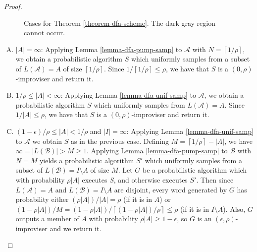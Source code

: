 \documentclass[a4paper,USenglish,numberwithinsect]{lipics}
\theoremstyle{plain}
\theoremstyle{definition}
\newcommand{\ceil}[1]{\left\lceil #1\right\rceil}
\newcommand{\improvs}{I}
\newcommand{\valids}{A}
\begin{document}
\begin{proof}
{\begin{figure}
\caption{Cases for Theorem \ref{theorem-dfa-scheme}. The dark gray
region cannot occur.}
\label{figure-proof-cases}
\end{figure}
}

\begin{enumerate}[(A)]
\item \label{case:pump-v} $|\valids| = \infty$: Applying Lemma
\ref{lemma-dfa-pump-samp} to $\mathcal{\valids}$ with $N =
\ceil{1/\rho}$, we obtain a probabilistic algorithm $S$ which uniformly samples from a
subset of $L(\mathcal{\valids}) = \valids$ of size
$\ceil{1/\rho}$. Since $1/\ceil{1/\rho} \le \rho$, we have that $S$ is
a $(0,\rho)$-improviser and return it. 

\item \label{case:unif-v} $1/\rho \le |\valids| < \infty$: Applying Lemma \ref{lemma-dfa-unif-samp} to $\mathcal{\valids}$, we obtain a probabilistic algorithm $S$ which uniformly samples from $L(\mathcal{\valids}) = \valids$. Since $1/|\valids| \le \rho$, we have that $S$ is a $(0,\rho)$-improviser and return it.

\item \label{case:pump-i-unif-v} $(1-\epsilon)/\rho \le |\valids| < 1/\rho$ and $| \improvs | = \infty$: Applying Lemma \ref{lemma-dfa-unif-samp} to $\mathcal{\valids}$ we obtain $S$ as in the previous case. Defining $M = \ceil{1/\rho} - |\valids|$, we have $\infty = |L(\mathcal{B})| > M \ge 1$. Applying Lemma \ref{lemma-dfa-pump-samp} to $\mathcal{B}$ with $N = M$ yields a probabilistic algorithm $S'$ which uniformly samples from a subset of $L(\mathcal{B}) = \improvs \setminus \valids$ of size $M$. Let $G$ be a probabilistic algorithm which with probability $\rho |\valids|$ executes $S$, and otherwise executes $S'$. Then since $L(\mathcal{\valids}) = \valids$ and $L(\mathcal{B}) = \improvs \setminus \valids$ are disjoint, every word generated by $G$ has probability either $(\rho |\valids|) / |\valids| = \rho$ (if it is in $\valids$) or $(1 - \rho |\valids|) / M = (1 - \rho |\valids|) / \ceil{(1 - \rho |\valids|) / \rho} \le \rho$ (if it is in $\improvs \setminus \valids$). Also, $G$ outputs a member of $\valids$ with probability $\rho |\valids| \ge 1 - \epsilon$, so $G$ is an $(\epsilon,\rho)$-improviser and we return it.


\end{enumerate}
\end{proof}
\end{document}
